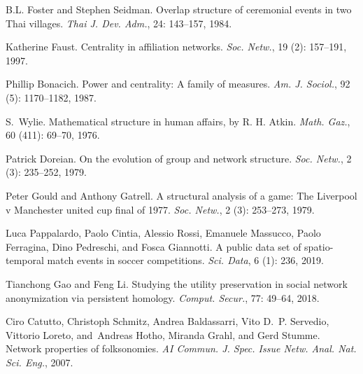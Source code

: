 B.L. Foster and Stephen Seidman.
\newblock Overlap structure of ceremonial events in two {{Thai}} villages.
\newblock \emph{Thai J. Dev. Adm.}, 24: 143--157, 1984.

Katherine Faust.
\newblock Centrality in affiliation networks.
\newblock \emph{Soc. Netw.}, 19 (2): 157--191, 1997.

Phillip Bonacich.
\newblock Power and centrality: {{A}} family of measures.
\newblock \emph{Am. J. Sociol.}, 92 (5): 1170--1182, 1987.

S.~Wylie.
\newblock Mathematical structure in human affairs, by {{R}}. {{H}}. {{Atkin}}.
\newblock \emph{Math. Gaz.}, 60 (411): 69--70, 1976.

Patrick Doreian.
\newblock On the evolution of group and network structure.
\newblock \emph{Soc. Netw.}, 2 (3): 235--252, 1979.

Peter Gould and Anthony Gatrell.
\newblock A structural analysis of a game: {{The Liverpool}} v {{Manchester}}
united cup final of 1977.
\newblock \emph{Soc. Netw.}, 2 (3): 253--273, 1979.

Luca Pappalardo, Paolo Cintia, Alessio Rossi, Emanuele Massucco, Paolo
Ferragina, Dino Pedreschi, and Fosca Giannotti.
\newblock A public data set of spatio-temporal match events in soccer
competitions.
\newblock \emph{Sci. Data}, 6 (1): 236, 2019.

Tianchong Gao and Feng Li.
\newblock Studying the utility preservation in social network anonymization via
persistent homology.
\newblock \emph{Comput. Secur.}, 77: 49--64, 2018.

Ciro Catutto, Christoph Schmitz, Andrea Baldassarri, Vito D.~P. Servedio,
Vittorio Loreto, {and}~Andreas Hotho, Miranda Grahl, and Gerd Stumme.
\newblock Network properties of folksonomies.
\newblock \emph{AI Commun. J. Spec. Issue Netw. Anal. Nat. Sci. Eng.}, 2007.

